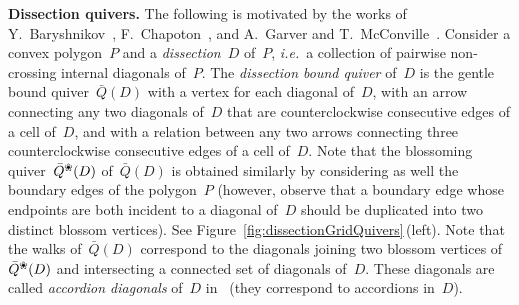 \documentclass{amsart}
\theoremstyle{definition}
\newcommand{\fref}[1]{Figure~\ref{#1}} %
\newcommand{\ie}{\textit{i.e.}~} %
\newcommand{\darkblue}{\color{darkblue}} %
\newcommand{\defn}[1]{\textsl{\darkblue #1}} %
\newcommand{\para}[1]{\medskip\noindent\textbf{#1.}} %
\newcommand{\blossom}{^\text{\ding{96}}} %
\begin{document}
\para{Dissection quivers}
The following is motivated by the works of Y.~Baryshnikov~\cite{Baryshnikov}, F.~Chapoton~\cite{Chapoton-quadrangulations}, and A.~Garver and T.~McConville~\cite{GarverMcConville}.
Consider a convex polygon~$P$ and a \defn{dissection}~$D$ of~$P$, \ie a collection of pairwise non-crossing internal diagonals of~$P$.
The \defn{dissection bound quiver} of~$D$ is the gentle bound quiver~$\bar Q(D)$ with a vertex for each diagonal of~$D$, with an arrow connecting any two diagonals of~$D$ that are counterclockwise consecutive edges of a cell of~$D$, and with a relation between any two arrows connecting three counterclockwise consecutive edges of a cell of~$D$.
Note that the blossoming quiver~$\bar Q\blossom(D)$ of~$\bar Q(D)$ is obtained similarly by considering as well the boundary edges of the polygon~$P$ (however, observe that a boundary edge whose endpoints are both incident to a diagonal of~$D$ should be duplicated into two distinct blossom vertices).
See \fref{fig:dissectionGridQuivers}\,(left).
Note that the walks of~$\bar Q(D)$ correspond to the diagonals joining two blossom vertices of~$\bar Q\blossom(D)$ and intersecting a connected set of diagonals of~$D$.
These diagonals are called \defn{accordion diagonals} of~$D$ in~\cite{MannevillePilaud-accordion} (they correspond to accordions in~$D$).
\end{document}
